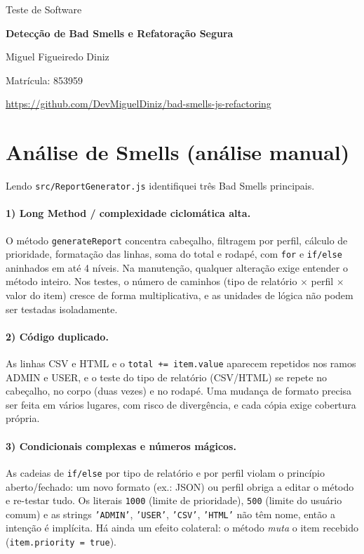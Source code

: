 \documentclass[12pt,a4paper]{article}
\begin{document}
\begin{titlepage}
  \centering
  \vspace*{3cm}
  {\Large Teste de Software\par}
  \vspace{1.5cm}
  {\LARGE\bfseries Detecção de Bad Smells e Refatoração Segura\par}
  \vspace{3cm}
  {\large Miguel Figueiredo Diniz\par}
  {\large Matrícula: 853959\par}
  \vfill
  {\small \url{https://github.com/DevMiguelDiniz/bad-smells-js-refactoring}\par}
  \vspace{1cm}
\end{titlepage}

\section{Análise de Smells (análise manual)}
Lendo \texttt{src/ReportGenerator.js} identifiquei três Bad Smells principais.

\paragraph{1) Long Method / complexidade ciclomática alta.} O método \texttt{generateReport} concentra cabeçalho, filtragem por perfil, cálculo de prioridade, formatação das linhas, soma do total e rodapé, com \texttt{for} e \texttt{if/else} aninhados em até 4 níveis. Na manutenção, qualquer alteração exige entender o método inteiro. Nos testes, o número de caminhos (tipo de relatório $\times$ perfil $\times$ valor do item) cresce de forma multiplicativa, e as unidades de lógica não podem ser testadas isoladamente.

\paragraph{2) Código duplicado.} As linhas CSV e HTML e o \texttt{total += item.value} aparecem repetidos nos ramos ADMIN e USER, e o teste do tipo de relatório (CSV/HTML) se repete no cabeçalho, no corpo (duas vezes) e no rodapé. Uma mudança de formato precisa ser feita em vários lugares, com risco de divergência, e cada cópia exige cobertura própria.

\paragraph{3) Condicionais complexas e números mágicos.} As cadeias de \texttt{if/else} por tipo de relatório e por perfil violam o princípio aberto/fechado: um novo formato (ex.: JSON) ou perfil obriga a editar o método e re-testar tudo. Os literais \texttt{1000} (limite de prioridade), \texttt{500} (limite do usuário comum) e as strings \texttt{'ADMIN'}, \texttt{'USER'}, \texttt{'CSV'}, \texttt{'HTML'} não têm nome, então a intenção é implícita. Há ainda um efeito colateral: o método \emph{muta} o item recebido (\texttt{item.priority = true}).
\end{document}
